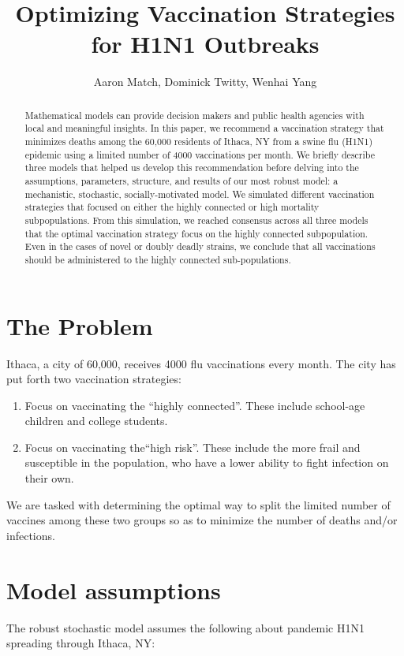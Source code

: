 \documentclass[titlepage]{article}
\begin{document}
\title{Optimizing Vaccination Strategies for H1N1 Outbreaks}
\author{Aaron Match, Dominick Twitty, Wenhai Yang}
\maketitle

\begin{abstract}
Mathematical models can provide decision makers and public health agencies with local and meaningful insights. In this paper, we recommend a vaccination strategy that minimizes deaths among the 60,000 residents of Ithaca, NY from a swine flu (H1N1) epidemic using a limited number of 4000 vaccinations per month. We briefly describe three models that helped us develop this recommendation before delving into the assumptions, parameters, structure, and results of our most robust model: a mechanistic, stochastic, socially-motivated model. We simulated different vaccination strategies that focused on either the highly connected or high mortality subpopulations. From this simulation, we reached consensus across all three models that the optimal vaccination strategy focus on the highly connected subpopulation. Even in the cases of novel or doubly deadly strains, we conclude that all vaccinations should be administered to the highly connected sub-populations.
\end{abstract}
\section{The Problem}
Ithaca, a city of 60,000, receives 4000 flu vaccinations every month. The city has put forth two vaccination strategies:
\begin{enumerate}
\item Focus on vaccinating the ``highly connected''. These include school-age children and college students.

\item Focus on vaccinating the``high risk''. These include the more frail and susceptible in the population, who have a lower ability to fight infection on their own.
\end{enumerate}

We are tasked with determining the optimal way to split the limited number of vaccines among these two groups so as to minimize the number of deaths and/or infections.


\section{Model assumptions}
The robust stochastic model assumes the following about pandemic H1N1 spreading through Ithaca, NY:
\end{document}
